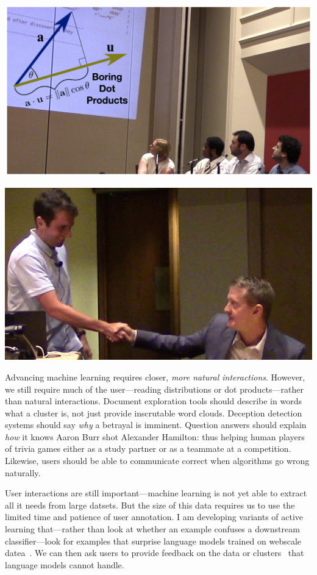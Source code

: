 \documentclass[11pt]{amsart}
\begin{document}
  \begin{minipage}[b]{0.4\textwidth}
    \includegraphics[width=\textwidth]{images/boring_dot_products}
  \end{minipage}
  \hfill
\begin{minipage}[b]{0.4\textwidth}
    \includegraphics[width=\textwidth]{images/jennings_handshake}
  \end{minipage}

Advancing machine learning requires closer, \emph{more natural interactions}.
However, we still require much of the user---reading distributions or dot
products---rather than natural interactions. Document exploration tools should
describe in words what a cluster is, not just provide inscrutable word clouds.
Deception detection systems should say \emph{why} a betrayal is imminent.
Question answers should explain \emph{how} it knows Aaron Burr shot Alexander
Hamilton: thus helping human players of trivia games either as a study partner
or as a teammate at a competition. Likewise, users should be able to
communicate correct when algorithms go wrong naturally.

User interactions are still important---machine learning is not yet able to
extract all it needs from large datsets. But the size of this data requires us
to use the limited time and patience of user annotation. I am developing
variants of active learning that---rather than look at whether an example
confuses a downstream classifier---look for examples that surprise language
models trained on webscale datea~\cite{devlin-19}. We can then ask users to
provide feedback on the data or clusters~\cite{poursabzi-16} that language
models cannot handle.
\end{document}
